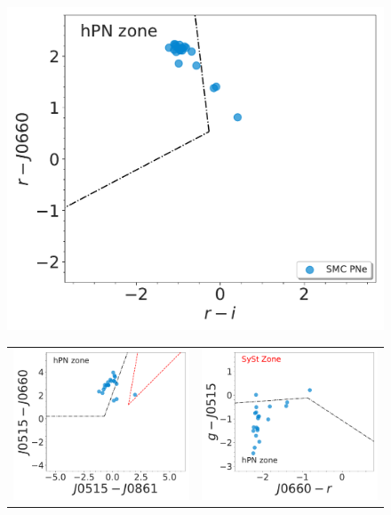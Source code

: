 \documentclass[11pt]{article}
\newcommand\raiselabel[1]{\raisebox{0.9\figwidth}[-0.5\figwidth]{#1}}
\begin{document}
\begin{figure}[!h]
  \includegraphics[width=0.5\linewidth, trim=10 10 10 10, clip]{Fig1-IDR2-SPLUS-vironen.pdf}
\end{figure}

\begin{figure}[1h]
\centering
\begin{tabular}{l l}
 \includegraphics[width=0.5\linewidth, trim=10 10 10 10, clip]{Fig2-IDR2-SPLUS-J0515_J0660.pdf} & \includegraphics[width=0.5\linewidth, trim=10 10 10 10, clip]{Fig4-IDR2-SPLUS-g.pdf} \\

\end{tabular}
\end{figure}
\end{document}
